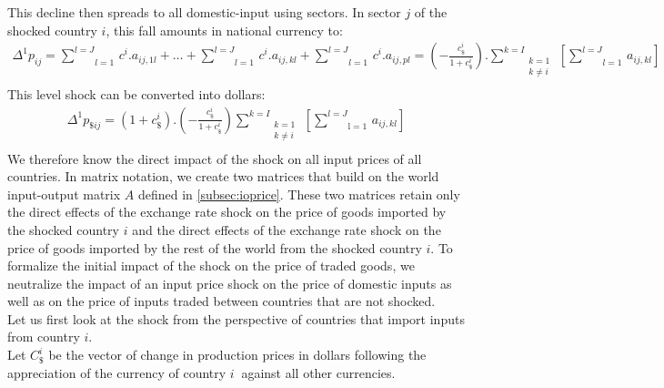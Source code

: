 \documentclass[11pt,a4paper]{article}
\begin{document}
This decline then spreads to all domestic-input using sectors. In sector $j$ of the shocked country $i$, this fall amounts in national currency to: \\
\begin{eqnarray*}
\Delta^1p_{ij}=\underset{l=1}{\overset{l=J}{\mathop \sum}}\,c^i.a_{ij,1l}+\ldots +\underset{l=1}{\overset{{l}=J}{\mathop \sum }}\,c^i.a_{ij,kl}+\underset{l=1}{\overset{l={J}}{\mathop \sum }}\,c^i.{{a}_{ij,pl}}=\left( -\frac{c_\$^i}{1+c_\$^i}\right).\underset{\begin{matrix}k=1\\k\neq i\\\end{matrix}}{\overset{k=I}{\mathop\sum}}\,\left[\underset{l=1}{\overset{l=J}{\mathop\sum}}\,a_{ij,kl}\right] 
\end{eqnarray*}
This level shock can be converted into dollars: \\
\begin{eqnarray}
{{\Delta }^{1}}{{{p}}_{\$ij}}=\left(1+c_\$^i\right).\left(-\frac{c_\$^i}{1+c_\$^i}\right)\underset{\begin{matrix}k=1\\k\neq i\\\end{matrix}}{\overset{{k}={I}}{\mathop\sum}}\,\left[\underset{\text{l}=1}{\overset{{l}={J}}{\mathop\sum}}\,{{{a}}_{ij,kl}}\right] 
\label{eq:eq2}
\end{eqnarray}
We therefore know the direct impact of the shock on all input prices of all countries.
In matrix notation, we create two matrices that build on the world input-output matrix $A$ defined in \ref{subsec:ioprice}. These two matrices retain only the direct effects of the exchange rate shock on the price of goods imported by the shocked country $i$ and the direct effects of the exchange rate shock on the price of goods imported by the rest of the world from the shocked country $i$. To formalize the initial impact of the shock on the price of traded goods, we neutralize the impact of an input price shock on the price of domestic inputs as well as on the price of inputs traded between countries that are not shocked.\\
Let us first look at the shock from the perspective of countries that import inputs from country $i$.\\
Let $C_\$^i$ be the vector of change in production prices in dollars following the 
appreciation of the currency of country $i~$ against all other currencies.
\end{document}
